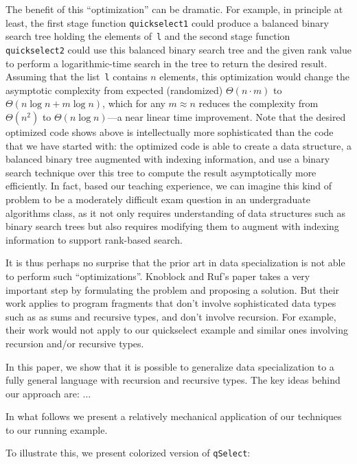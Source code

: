 The benefit of this ``optimization'' can be dramatic.  For example, in
principle at least, the first stage function \texttt{quickselect1}
could produce a balanced binary search tree holding the elements
of~\texttt{l} and the second stage function \texttt{quickselect2}
could use this balanced binary search tree and the given rank value to
perform a logarithmic-time search in the tree to return the desired
result.  Assuming that the list~\texttt{l} contains $n$ elements, this
optimization would change the asymptotic complexity from expected
(randomized) $\Theta(n \cdot m)$ to $\Theta(n\log{n} + m\log{n})$, which for any $m \approx n$ reduces the complexity
from $\Theta (n^2)$ to $\Theta(n\log{n})$---a near linear time
improvement.  Note that the desired optimized code shows above is
intellectually more sophisticated than the code that we have started
with: the optimized code is able to create a data structure, a
balanced binary tree augmented with indexing information, and use a
binary search technique over this tree to compute the result
asymptotically more efficiently.  In fact, based our teaching
experience, we can imagine this kind of problem to be a moderately
difficult exam question in an undergraduate algorithms class, as it
not only requires understanding of data structures such as binary
search trees but also requires modifying them to augment with indexing
information to support rank-based search.


It is thus perhaps no surprise that the prior art in data
specialization is not able to perform such ``optimizations''.
Knoblock and Ruf's paper takes a very important step by formulating
the problem and proposing a solution.  But their work applies to
program fragments that don't involve sophisticated data types such as
as sums and recursive types, and don't involve recursion. For example,
their work would not apply to our quickselect example and similar ones
involving recursion and/or  recursive types.

In this paper, we show that it is possible to generalize data
specialization to a fully general language with recursion and
recursive types.  The key ideas behind our approach are: ...


In what follows we present a relatively mechanical application of our
techniques to our running example. 




To illustrate this, we present colorized version of \texttt{qSelect}:

